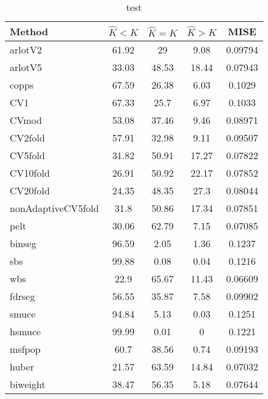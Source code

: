 \begin{table}[ht]
\centering
\begin{tabular}{l|cccc}
  \hline
Method & $\hat{K} < K$ & $\hat{K} = K$ & $\hat{K} > K$ & MISE \\ 
  \hline
arlotV2 & 61.92 &    29 &  9.08 & 0.09794 \\ 
  arlotV5 & 33.03 & 48.53 & 18.44 & 0.07943 \\ 
  copps & 67.59 & 26.38 &  6.03 & 0.1029 \\ 
  CV1 & 67.33 &  25.7 &  6.97 & 0.1033 \\ 
  CVmod & 53.08 & 37.46 &  9.46 & 0.08971 \\ 
  CV2fold & 57.91 & 32.98 &  9.11 & 0.09507 \\ 
  CV5fold & 31.82 & 50.91 & 17.27 & 0.07822 \\ 
  CV10fold & 26.91 & 50.92 & 22.17 & 0.07852 \\ 
  CV20fold & 24.35 & 48.35 &  27.3 & 0.08044 \\ 
  nonAdaptiveCV5fold &  31.8 & 50.86 & 17.34 & 0.07851 \\ 
  pelt & 30.06 & 62.79 &  7.15 & 0.07085 \\ 
  binseg & 96.59 &  2.05 &  1.36 & 0.1237 \\ 
  sbs & 99.88 &  0.08 &  0.04 & 0.1216 \\ 
  wbs &  22.9 & 65.67 & 11.43 & 0.06609 \\ 
  fdrseg & 56.55 & 35.87 &  7.58 & 0.09902 \\ 
  smuce & 94.84 &  5.13 &  0.03 & 0.1251 \\ 
  hsmuce & 99.99 &  0.01 &     0 & 0.1221 \\ 
  msfpop &  60.7 & 38.56 &  0.74 & 0.09193 \\ 
  huber & 21.57 & 63.59 & 14.84 & 0.07032 \\ 
  biweight & 38.47 & 56.35 &  5.18 & 0.07644 \\ 
   \hline
\end{tabular}
\caption{test} 
\end{table}
